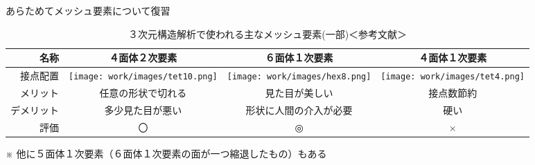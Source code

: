 \begin{frame}{あらためてメッシュ要素について復習}
  \begin{table}[hbtp]
    \caption{３次元構造解析で使われる主なメッシュ要素(一部)＜参考文献\cite{handbook}＞}
    \vspace{-5mm}
    \begin{NiceTabular}{|r|c|c|c|} %
       \hline
       名称       & ４面体２次要素 & ６面体１次要素 & ４面体１次要素 \\
       \midrule
       接点配置 &  \texttt{[image: work/images/tet10.png]}
                & \texttt{[image: work/images/hex8.png]} 
                & \texttt{[image: work/images/tet4.png]}  \\
       \hline
       メリット   & 任意の形状で切れる & 見た目が美しい & 接点数節約 \\
       \hline
       デメリット & 多少見た目が悪い   & 形状に人間の介入が必要 & 硬い \\
       \hline
       評価       &   〇               & ◎              & × \\
       \hline
    \end{NiceTabular}
    ※ 他に５面体１次要素（６面体１次要素の面が一つ縮退したもの）もある
  \end{table}
\end{frame}
